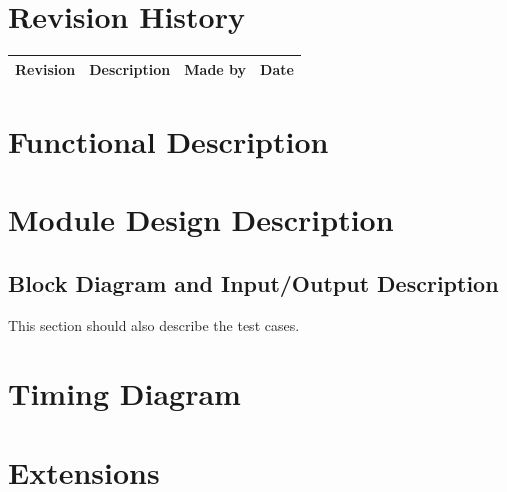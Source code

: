 \documentclass[12pt]{article}
\title{\flushright{Module Name Here}}
\date{}
\begin{document}
\maketitle
\thispagestyle{fancy}
\vspace{-2cm}
\section{Revision History}
\begin{table}[!htb]
\renewcommand\arraystretch{1.2}
\label{tab:Rev}
\begin{tabular}{|l|l|l|l|}
\hline%
Revision    & Description            & Made by      & Date                       \\
\hline

\hline
\end{tabular}
\end{table}
\section{Functional Description}

\section{Module Design Description}

\subsection{Block Diagram and Input/Output Description}
This section should also describe the test cases. 
\section{Timing Diagram}
\section{Extensions}
\end{document}
